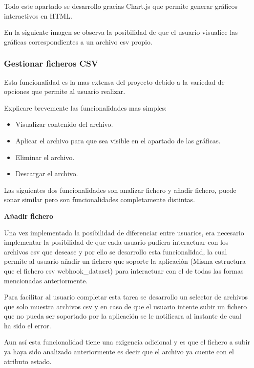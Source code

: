 Todo este apartado se desarrollo gracias Chart.js que permite generar gráficos interactivos en HTML.



En la siguiente imagen se observa la posibilidad de que el usuario visualice las gráficas correspondientes a un archivo csv propio. 



\subsubsection{Gestionar ficheros CSV}

Esta funcionalidad es la mas extensa del proyecto debido a la variedad de opciones que permite al usuario realizar.

Explicare brevemente las funcionalidades mas simples:

\begin{itemize}
    \item Visualizar contenido del archivo.
    \item Aplicar el archivo para que sea visible en el apartado de las gráficas.
    \item Eliminar el archivo.
    \item Descargar el archivo.
\end{itemize}

Las siguientes dos funcionalidades son analizar fichero y añadir fichero, puede sonar similar pero son funcionalidades completamente distintas.

\textbf{Añadir fichero}

Una vez implementada la posibilidad de diferenciar entre usuarios, era necesario implementar la posibilidad de que cada usuario pudiera interactuar con los archivos csv que desease y por ello se desarrollo esta funcionalidad, la cual permite al usuario añadir un fichero que soporte la aplicación (Misma estructura que el fichero csv webhook\_dataset) para interactuar con el de todas las formas mencionadas anteriormente.

Para facilitar al usuario completar esta tarea se desarrollo un selector de archivos que solo muestra archivos csv y en caso de que el usuario intente subir un fichero que no pueda ser soportado por la aplicación se le notificara al instante de cual ha sido el error. 

Aun así esta funcionalidad tiene una exigencia adicional y es que el fichero a subir ya haya sido analizado anteriormente es decir que el archivo ya cuente con el atributo estado.

